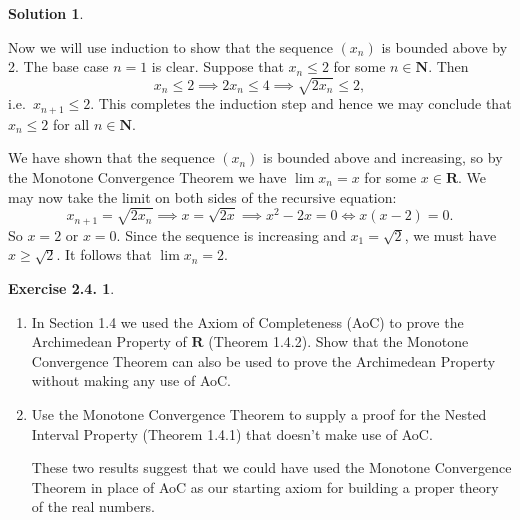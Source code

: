 \documentclass[12pt]{article}
\theoremstyle{definition}
\theoremstyle{exercise}
\newtheorem{exercise}{Exercise 2.4.}
\theoremstyle{solution}
\newtheorem*{solution}{Solution}
\newcommand{\N}{\mathbf{N}}
\newcommand{\R}{\mathbf{R}}
\begin{document}
\begin{solution}
\begin{enumerate}
        Now we will use induction to show that the sequence \( (x_n) \) is bounded above by 2. The base case \( n = 1 \) is clear. Suppose that \( x_n \leq 2 \) for some \( n \in \N \). Then
        \[
            x_n \leq 2 \implies 2 x_n \leq 4 \implies \sqrt{2 x_n} \leq 2,
        \]
        i.e.\ \( x_{n+1} \leq 2 \). This completes the induction step and hence we may conclude that \( x_n \leq 2 \) for all \( n \in \N \).

        We have shown that the sequence \( (x_n) \) is bounded above and increasing, so by the Monotone Convergence Theorem we have \( \lim x_n = x \) for some \( x \in \R \). We may now take the limit on both sides of the recursive equation:
        \[
            x_{n+1} = \sqrt{2 x_n} \implies x = \sqrt{2 x} \implies x^2 - 2x = 0 \iff x(x - 2) = 0.
        \]
        So \( x = 2 \) or \( x = 0 \). Since the sequence is increasing and \( x_1 = \sqrt{2} \), we must have \( x \geq \sqrt{2} \). It follows that \( \lim x_n = 2 \).
    \end{enumerate}
\end{solution}

\begin{exercise}
\label{ex:4}
    \begin{enumerate}
        \item In Section 1.4 we used the Axiom of Completeness (AoC) to prove the Archimedean Property of \( \R \) (Theorem 1.4.2). Show that the Monotone Convergence Theorem can also be used to prove the Archimedean Property without making any use of AoC.

        \item Use the Monotone Convergence Theorem to supply a proof for the Nested Interval Property (Theorem 1.4.1) that doesn't make use of AoC.

        These two results suggest that we could have used the Monotone Convergence Theorem in place of AoC as our starting axiom for building a proper theory of the real numbers.
    \end{enumerate}
\end{exercise}
\end{document}
